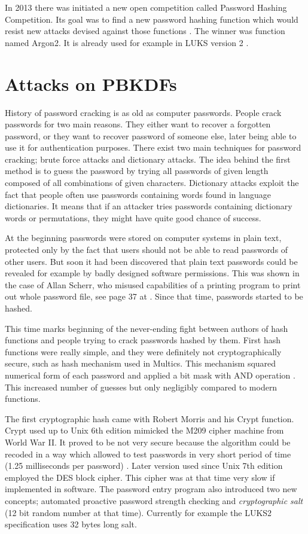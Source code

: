 \documentclass[nolof,digital]{fithesis3}
\begin{document}
In 2013 there was initiated a new open competition called Password Hashing Competition. Its goal was to find a new password hashing function which would resist new attacks devised against those functions \parencite{phc}. The winner was function named Argon2. It is already used for example in LUKS version 2 \parencite{luks2}.

\section{Attacks on PBKDFs}
\label{sec:attacks}
History of password cracking is as old as computer passwords. People crack passwords for two main reasons. They either want to recover a forgotten password, or they want to recover password of someone else, later being able to use it for authentication purposes. There exist two main techniques for password cracking; brute force attacks and dictionary attacks. The idea behind the first method is to guess the password by trying all passwords of given length composed of all combinations of given characters. Dictionary attacks exploit the fact that people often use passwords containing words found in language dictionaries. It means that if an attacker tries passwords containing dictionary words or permutations, they might have quite good chance of success.

At the beginning passwords were stored on computer systems in plain text, protected only by the fact that users should not be able to read passwords of other users. But soon it had been discovered that plain text passwords could be revealed for example by badly designed software permissions. This was shown in the case of Allan Scherr, who misused capabilities of a printing program to print out whole password file, see page 37 at \parencite{ctss}. Since that time, passwords started to be hashed.

This time marks beginning of the never-ending fight between authors of hash functions and people trying to crack passwords hashed by them. First hash functions were really simple, and they were definitely not cryptographically secure, such as hash mechanism used in Multics. This mechanism squared numerical form of each password and applied a bit mask with AND operation \parencite{multicssecurity}. This increased number of guesses but only negligibly compared to modern functions.

The first cryptographic hash came with Robert Morris and his Crypt function. Crypt used up to Unix 6th edition mimicked the M209 cipher machine from World War II. It proved to be not very secure because the algorithm could be recoded in a way which allowed to test passwords in very short period of time (1.25 milliseconds per password) \parencite{pshistory}. Later version used since Unix 7th edition employed the DES block cipher. This cipher was at that time very slow if implemented in software. The password entry program also introduced two new concepts; automated proactive password strength checking and \emph{cryptographic salt} (12 bit random number at that time). Currently for example the LUKS2 specification uses 32 bytes long salt.
\end{document}
